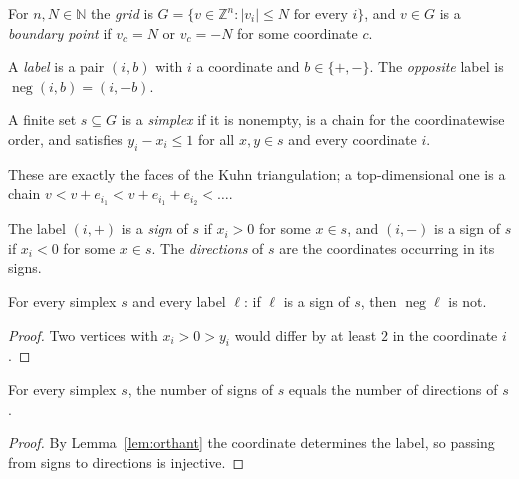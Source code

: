 \begin{definition}
\label{def:grid}
\leanok
For $n, N \in \mathbb{N}$ the \emph{grid} is
$G = \{ v \in \mathbb{Z}^n : |v_i| \le N \text{ for every } i \}$, and $v \in G$ is a
\emph{boundary point} if $v_c = N$ or $v_c = -N$ for some coordinate $c$.
\end{definition}

\begin{definition}[Labels]
\label{def:label}
\leanok
A \emph{label} is a pair $(i, b)$ with $i$ a coordinate and $b \in \{+, -\}$. The
\emph{opposite} label is $\operatorname{neg}(i, b) = (i, -b)$.
\end{definition}

\begin{definition}[Simplex]
\label{def:simplex}
\leanok
{}
A finite set $s \subseteq G$ is a \emph{simplex} if it is nonempty, is a chain for the
coordinatewise order, and satisfies $y_i - x_i \le 1$ for all $x, y \in s$ and every
coordinate $i$.
\end{definition}

These are exactly the faces of the Kuhn triangulation; a top-dimensional one is a
chain $v < v + e_{i_1} < v + e_{i_1} + e_{i_2} < \dots$.

\begin{definition}
\label{def:signs}
\leanok
{}
The label $(i, +)$ is a \emph{sign} of $s$ if $x_i > 0$ for some $x \in s$, and
$(i, -)$ is a sign of $s$ if $x_i < 0$ for some $x \in s$. The \emph{directions} of
$s$ are the coordinates occurring in its signs.
\end{definition}

\begin{lemma}
\label{lem:orthant}
\leanok
{}
For every simplex $s$ and every label $\ell$: if $\ell$ is a sign of $s$, then
$\operatorname{neg} \ell$ is not.
\end{lemma}
\begin{proof}
\leanok
Two vertices with $x_i > 0 > y_i$ would differ by at least $2$ in the coordinate $i$.
\end{proof}

\begin{lemma}
\label{lem:card-signs}
\leanok
For every simplex $s$, the number of signs of $s$ equals the number of directions of
$s$.
\end{lemma}
\begin{proof}
\leanok
{}
By Lemma~\ref{lem:orthant} the coordinate determines the label, so passing from signs
to directions is injective.
\end{proof}

